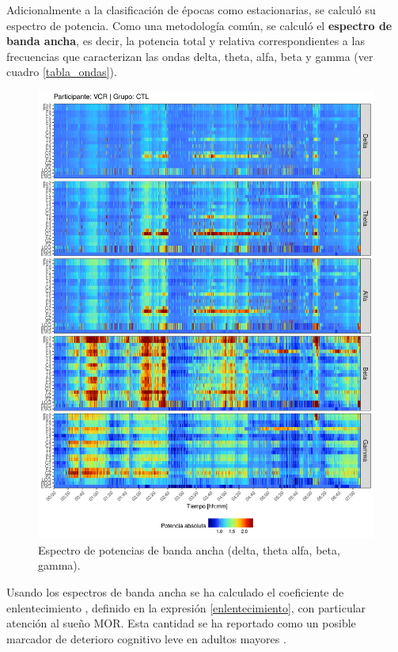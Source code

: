 Adicionalmente a la clasificación de épocas como estacionarias, se calculó su espectro de potencia. 
Como una metodología común, se calculó el \textbf{espectro de banda ancha},
es decir, la potencia total y relativa correspondientes a las frecuencias que caracterizan las ondas 
delta, theta, alfa, beta y gamma (ver cuadro \ref{tabla_ondas}).

\begin{figure}
\centering
\includegraphics[width=\linewidth]
{./img_art_dfa/VCNNS1_espectral_total.png} 
\caption[Espectro de potencias de banda ancha]{Espectro de potencias de banda ancha (delta, theta
alfa, beta, gamma).}
\end{figure}

Usando los espectros de banda ancha se ha calculado el coeficiente de enlentecimiento \lento, 
definido en la 
expresión \ref{enlentecimiento}, con particular atención al sueño MOR. Esta cantidad
se ha reportado como un posible marcador de deterioro cognitivo leve en adultos mayores 
\cite{Brayet16}.

